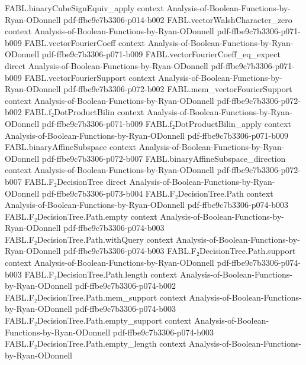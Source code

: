 \begin{theorem}
\proofstep
  {FABL.binaryCubeSignEquiv_apply}
  {context}
  {Analysis-of-Boolean-Functions-by-Ryan-ODonnell}
  {pdf-ffbe9c7b3306-p014-b002}
\proofstep
  {FABL.vectorWalshCharacter_zero}
  {context}
  {Analysis-of-Boolean-Functions-by-Ryan-ODonnell}
  {pdf-ffbe9c7b3306-p071-b009}
\proofstep
  {FABL.vectorFourierCoeff}
  {context}
  {Analysis-of-Boolean-Functions-by-Ryan-ODonnell}
  {pdf-ffbe9c7b3306-p071-b009}
\proofstep
  {FABL.vectorFourierCoeff_eq_expect}
  {direct}
  {Analysis-of-Boolean-Functions-by-Ryan-ODonnell}
  {pdf-ffbe9c7b3306-p071-b009}
\proofstep
  {FABL.vectorFourierSupport}
  {context}
  {Analysis-of-Boolean-Functions-by-Ryan-ODonnell}
  {pdf-ffbe9c7b3306-p072-b002}
\proofstep
  {FABL.mem_vectorFourierSupport}
  {context}
  {Analysis-of-Boolean-Functions-by-Ryan-ODonnell}
  {pdf-ffbe9c7b3306-p072-b002}
\proofstep
  {FABL.f₂DotProductBilin}
  {context}
  {Analysis-of-Boolean-Functions-by-Ryan-ODonnell}
  {pdf-ffbe9c7b3306-p071-b009}
\proofstep
  {FABL.f₂DotProductBilin_apply}
  {context}
  {Analysis-of-Boolean-Functions-by-Ryan-ODonnell}
  {pdf-ffbe9c7b3306-p071-b009}
\proofstep
  {FABL.binaryAffineSubspace}
  {context}
  {Analysis-of-Boolean-Functions-by-Ryan-ODonnell}
  {pdf-ffbe9c7b3306-p072-b007}
\proofstep
  {FABL.binaryAffineSubspace_direction}
  {context}
  {Analysis-of-Boolean-Functions-by-Ryan-ODonnell}
  {pdf-ffbe9c7b3306-p072-b007}
\proofstep
  {FABL.F₂DecisionTree}
  {direct}
  {Analysis-of-Boolean-Functions-by-Ryan-ODonnell}
  {pdf-ffbe9c7b3306-p073-b004}
\proofstep
  {FABL.F₂DecisionTree.Path}
  {context}
  {Analysis-of-Boolean-Functions-by-Ryan-ODonnell}
  {pdf-ffbe9c7b3306-p074-b003}
\proofstep
  {FABL.F₂DecisionTree.Path.empty}
  {context}
  {Analysis-of-Boolean-Functions-by-Ryan-ODonnell}
  {pdf-ffbe9c7b3306-p074-b003}
\proofstep
  {FABL.F₂DecisionTree.Path.withQuery}
  {context}
  {Analysis-of-Boolean-Functions-by-Ryan-ODonnell}
  {pdf-ffbe9c7b3306-p074-b003}
\proofstep
  {FABL.F₂DecisionTree.Path.support}
  {context}
  {Analysis-of-Boolean-Functions-by-Ryan-ODonnell}
  {pdf-ffbe9c7b3306-p074-b003}
\proofstep
  {FABL.F₂DecisionTree.Path.length}
  {context}
  {Analysis-of-Boolean-Functions-by-Ryan-ODonnell}
  {pdf-ffbe9c7b3306-p074-b002}
\proofstep
  {FABL.F₂DecisionTree.Path.mem_support}
  {context}
  {Analysis-of-Boolean-Functions-by-Ryan-ODonnell}
  {pdf-ffbe9c7b3306-p074-b003}
\proofstep
  {FABL.F₂DecisionTree.Path.empty_support}
  {context}
  {Analysis-of-Boolean-Functions-by-Ryan-ODonnell}
  {pdf-ffbe9c7b3306-p074-b003}
\proofstep
  {FABL.F₂DecisionTree.Path.empty_length}
  {context}
  {Analysis-of-Boolean-Functions-by-Ryan-ODonnell}

\end{theorem}
